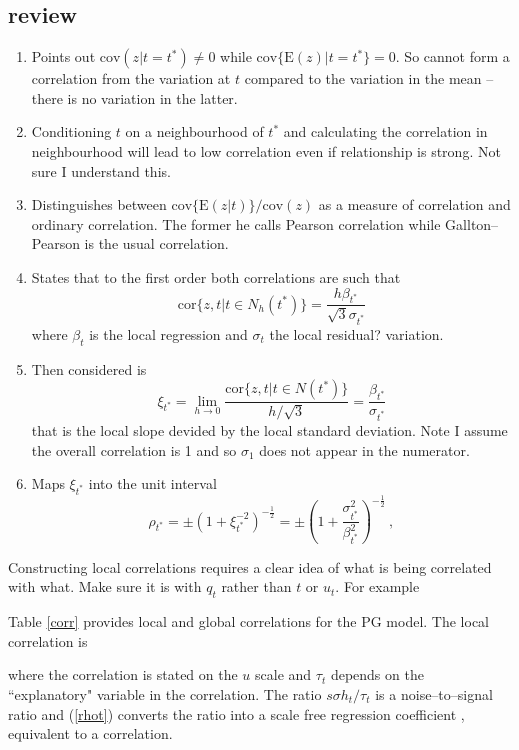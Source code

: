 \documentclass[authoryear]{elsarticle}
\newcommand{\E}{\mathrm{E}}
\newcommand{\cov}{\mathrm{cov}}
\newcommand{\cor}{\mathrm{cor}}
\newcommand{\eref}[1]{(\ref{#1})}
\newcommand{\tref}[1]{Table \ref{#1}}
\begin{document}
\subsection{\cite{bjerve1993correlation} review}
\begin{enumerate}
\item  Points out $\cov(z|t=t^*)\ne 0$  while $\cov\{\E(z)|t=t^*\}=0$.  So cannot form a correlation from the variation at $t$ compared to the variation in the mean -- there is no variation in the latter.
\item  Conditioning $t$ on a neighbourhood of $t^*$ and calculating the correlation in neighbourhood will lead to low correlation even if relationship is strong.  Not sure I understand this.
\item  Distinguishes between $\cov\{\E(z|t)\}/\cov(z)$ as a measure of correlation and ordinary correlation.  The former he calls Pearson correlation while Gallton--Pearson is the usual correlation.
\item  States that to the first order  both correlations are such that
$$
\cor\{z,t|t\in N_h(t^*)\}=\frac{h\beta_{t^*}}{\sqrt 3\sigma_{t^*}}
$$
where $\beta_t$ is the local regression and $\sigma_t$ the local residual? variation.
\item Then considered is
$$
\xi_{t^*} = \lim_{h \rightarrow 0}\frac{\cor\{z,t|t\in N(t^*)\}}{h/\sqrt 3} = \frac{\beta_{t^*}}{\sigma_{t^*}}
$$
that is the local slope devided by the local standard deviation.  Note I  assume the overall correlation is 1 and so $\sigma_1$ does not appear in the numerator.
\item  Maps $\xi_{t^*}$ into the unit interval
$$
\rho_{t^*}= \pm\left(1+\xi^{-2}_{t^*}\right)^{-\frac{1}{2}}= \pm\left(1+\frac{\sigma^2_{t^*}}{\beta^2_{t^*}}\right)^{-\frac{1}{2}}\ ,
$$

\end{enumerate}



Constructing local correlations requires a clear idea of what is being correlated with what.   Make sure it is with $q_t$ rather than $t$ or $u_t$.  For example 


 \tref{corr} provides local and global correlations for  the PG model.  The local correlation is

where the correlation is stated on the $u$ scale and $\tau_t$ depends on the ``explanatory" variable in the correlation.  The ratio $s\sigma h_t/\tau_t$ is a noise--to--signal ratio and \eref{rhot} converts the ratio  into a scale free regression coefficient \citep{bjerve1993correlation}, equivalent to a correlation. 
\end{document}
